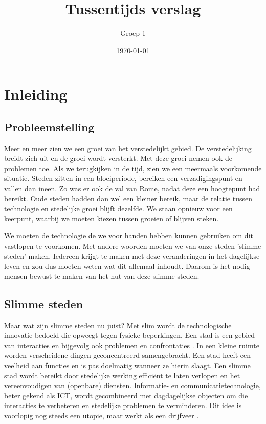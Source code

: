 \documentclass[a4paper,kulak]{kulakarticle}
\title{Tussentijds verslag}
\author{Groep 1}
\date{\today}
\begin{document}
		\maketitle
	
\section{Inleiding}

\subsection{Probleemstelling}
Meer en meer zien we een groei van het verstedelijkt gebied. De verstedelijking breidt zich uit en de groei wordt versterkt. Met deze groei nemen ook de problemen toe. Als we terugkijken in de tijd, zien we een meermaals voorkomende situatie. Steden zitten in een bloeiperiode, bereiken een verzadigingspunt en vallen dan ineen. Zo was er ook de val van Rome, nadat deze een hoogtepunt had bereikt. Oude steden hadden dan wel een kleiner bereik, maar de relatie tussen technologie en stedelijke groei blijft dezelfde.\cite{smartcities} We staan opnieuw voor een keerpunt, waarbij we moeten kiezen tussen groeien of blijven steken.

We moeten de technologie de we voor handen hebben kunnen gebruiken om dit vastlopen te voorkomen. Met andere woorden moeten we van onze steden 'slimme steden' maken. Iedereen krijgt te maken met deze veranderingen in het dagelijkse leven en zou dus moeten weten wat dit allemaal inhoudt. Daarom is het nodig mensen bewust te maken van het nut van deze slimme steden.

\subsection{Slimme steden}

Maar wat zijn slimme steden nu juist? Met slim wordt de technologische innovatie bedoeld die opweegt tegen fysieke beperkingen. Een stad is een gebied van interacties en bijgevolg ook problemen en confrontaties \cite{sc}. In een kleine ruimte worden verscheidene dingen geconcentreerd samengebracht. Een stad heeft een veelheid aan functies en is pas doelmatig \cite{synoniemen} wanneer ze hierin slaagt. Een slimme stad wordt bereikt door stedelijke werking efficiënt te laten verlopen en het vereenvoudigen van (openbare) diensten. Informatie- en communicatietechnologie, beter gekend als ICT, wordt gecombineerd met dagdagelijkse objecten om die interacties te verbeteren en stedelijke problemen te verminderen. Dit idee is voorlopig nog steeds een utopie, maar werkt als een drijfveer \cite{proconsc}.
\end{document}
